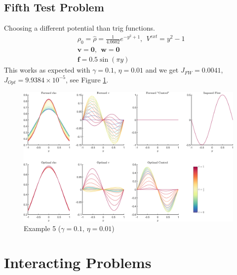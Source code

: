 \documentclass[11pt, a4paper]{article}
\theoremstyle{definition}
\newcommand{\Sta}{\rho}
\newcommand{\Stav}{\mathbf{v}}
\newcommand{\Con}{\mathbf{f}}
\begin{document}
\subsection{Fifth Test Problem}
Choosing a different potential than trig functions.
\begin{align*}
&\Sta_0 = \hat \Sta =  \frac{1}{4.0602}e^{- y^2 + 1}, \ \ V^{ext} = y^2 - 1\\
&\Stav = \mathbf{0}, \ \  \mathbf{w} = \mathbf{0}\\
&\Con = 0.5 \sin(\pi y) 
\end{align*}
This works as expected with $\gamma = 0.1$, $\eta = 0.01$ and we get $J_{FW} =0.0041$, $J_{Opt} = 9.9384 \times 10^{-5}$, see Figure \ref{fig5}.
\begin{figure}
	\includegraphics[scale=0.05]{Example5.png}
	\caption{Example 5 ($\gamma = 0.1$, $\eta = 0.01$)}
	\label{fig5}
\end{figure} 

\section{Interacting Problems}
\end{document}
